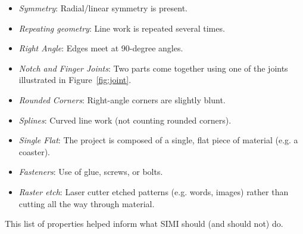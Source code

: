\begin{itemize}
\item \textit{Symmetry}: Radial/linear symmetry is present.
\item \textit{Repeating geometry}: Line work is repeated several times.
\item \textit{Right Angle}: Edges meet at 90-degree angles.
\item \textit{Notch and Finger Joints}: Two parts come together using one of
  the joints illustrated in Figure~\ref{fig:joint}.
\item \textit{Rounded Corners}: Right-angle corners are slightly blunt.
\item \textit{Splines}: Curved line work (not counting rounded corners).
\item \textit{Single Flat}: The project is composed of a single, flat
  piece of material (e.g. a coaster).
\item \textit{Fasteners}: Use of glue, screws, or bolts.
\item \textit{Raster etch}: Laser cutter etched patterns (e.g. words,
  images) rather than cutting all the way through material.
\end{itemize}

This list of properties helped inform what SIMI should (and should
not) do. 






